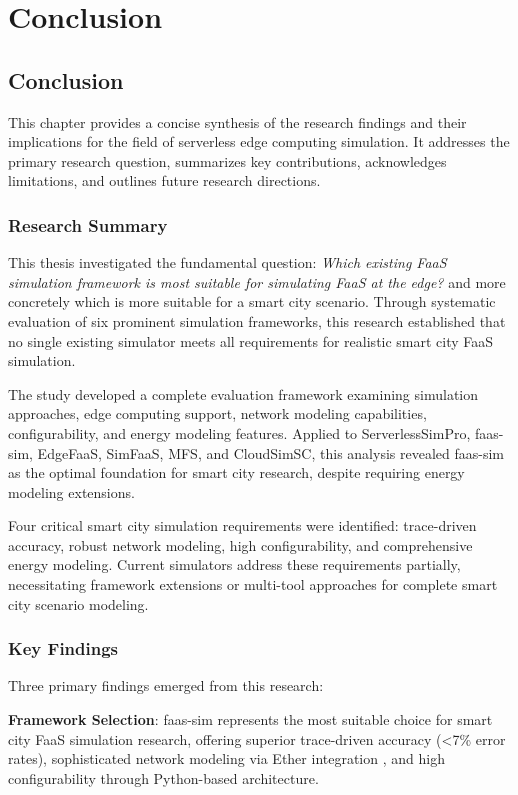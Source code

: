 \part{Conclusion}
\chapter{Conclusion}

This chapter provides a concise synthesis of the research findings and their implications for the field of serverless edge computing simulation. It addresses the primary research question, summarizes key contributions, acknowledges limitations, and outlines future research directions.

\section{Research Summary}

This thesis investigated the fundamental question: \textit{Which existing FaaS simulation framework is most suitable for  simulating FaaS at the edge?} and more concretely which is more suitable for a smart city scenario. Through systematic evaluation of six prominent simulation frameworks, this research established that no single existing simulator meets all requirements for realistic smart city FaaS simulation.

The study developed a complete evaluation framework examining simulation approaches, edge computing support, network modeling capabilities, configurability, and energy modeling features. Applied to ServerlessSimPro, faas-sim, EdgeFaaS, SimFaaS, MFS, and CloudSimSC, this analysis revealed faas-sim as the optimal foundation for smart city research, despite requiring energy modeling extensions.

Four critical smart city simulation requirements were identified: trace-driven accuracy, robust network modeling, high configurability, and comprehensive energy modeling. Current simulators address these requirements partially, necessitating framework extensions or multi-tool approaches for complete smart city scenario modeling.

\section{Key Findings}



Three primary findings emerged from this research:

\textbf{Framework Selection}: faas-sim represents the most suitable choice for smart city FaaS simulation research, offering superior trace-driven accuracy (<7\% error rates), sophisticated network modeling via Ether integration \cite{rausch2020ether}, and high configurability through Python-based architecture.

